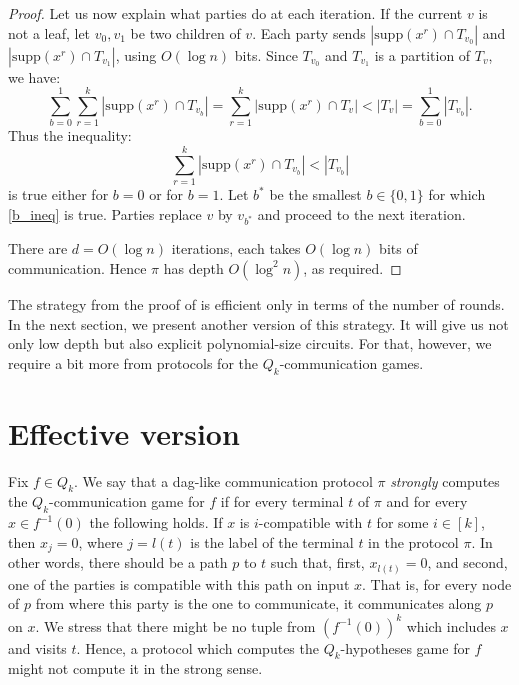 \begin{proof}
Let us now explain what parties do at each iteration. If the current $v$ is not a leaf,  let $v_0, v_1$ be two children of $v$. Each party sends $\left|\mathrm{supp}(x^r) \cap T_{v_0}\right|$ and $\left|\mathrm{supp}(x^r) \cap T_{v_1}\right|$, using $O(\log n)$ bits. Since $T_{v_0}$ and $T_{v_1}$ is a partition of $T_v$, we have:
\[
 \sum\limits_{b = 0}^1 \sum\limits_{r = 1}^k \left|\mathrm{supp}(x^r) \cap T_{v_b}\right| = \sum\limits_{r = 1}^k \left|\mathrm{supp}(x^r) \cap T_v\right| < |T_v| = \sum\limits_{b = 0}^1 |T_{v_b}|.
\]
Thus the inequality:
\begin{equation}
\label{b_ineq}
\sum\limits_{r = 1}^k \left|\mathrm{supp}(x^r) \cap T_{v_b}\right| < |T_{v_b}|
\end{equation}
is true either for $b = 0$ or for $b = 1$. Let $b^*$ be the smallest $b\in\{0, 1\}$ for which \eqref{b_ineq} is true. Parties replace $v$ by $v_{b^*}$ and proceed to the next iteration.

There are $d = O(\log n)$ iterations, each takes $O(\log n)$ bits of communication. Hence $\pi$
%
has depth $O(\log^2 n)$, as required. %
\end{proof}



\begin{remark}
The strategy from the proof of  is efficient only in terms of the number of rounds. 
In the next section, we present another version of this strategy. 
It will give us not only %
low depth  %
but also explicit polynomial-size circuits.  For that, however, we require a bit more from protocols for the $Q_k$-communication games. 
\end{remark}


 


\section{Effective version} \label{sec:effective}

Fix $f\in Q_k$. We say that a dag-like communication protocol $\pi$ \emph{strongly} computes the $Q_k$-communication game for $f$ if for every terminal $t$ of $\pi$ and for every $x\in f^{-1}(0)$ the following holds. If $x$ is $i$-compatible with $t$ for some $i\in[k]$, then $x_j = 0$, where $j = l(t)$ is the label of the terminal $t$ in the protocol $\pi$. In other words, there should be a  path $p$ to $t$ such that, first, $x_{l(t)} = 0$, and second, one of the parties is  compatible with this path on input $x$. That is, for every node of $p$ from where this party is the one to communicate, it communicates along $p$ on $x$. We stress that there might be no tuple from $(f^{-1}(0))^k$ which includes $x$ and visits $t$. Hence, a protocol which computes the $Q_k$-hypotheses game for $f$ might not compute it in the strong sense. 

